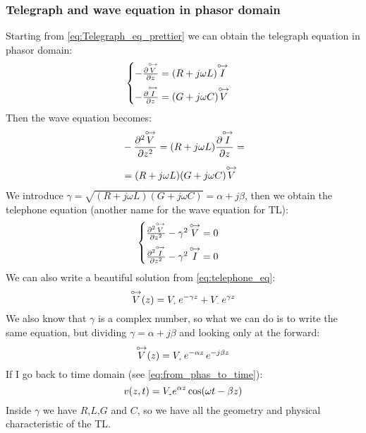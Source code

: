 \subsubsection*{Telegraph and wave equation in phasor domain}
Starting from \cref{eq:Telegraph_eq_prettier} we can obtain the telegraph equation in phasor domain:
\begin{equation}
  \begin{cases}\label{eq:telegraph_in_phas_1}
  -\frac{\partial \overset{\mathbin {{\circ \mkern-2.5mu\rightarrow}}}{V}}{\partial z}=(R+j\omega L)\overset{\mathbin {{\circ \mkern-2.5mu\rightarrow}}}{I}\\[5pt]
  -\frac{\partial \overset{\mathbin {{\circ \mkern-2.5mu\rightarrow}}}{I}}{\partial z}=(G+j\omega C)\overset{\mathbin {{\circ \mkern-2.5mu\rightarrow}}}{V}
  \end{cases}
\end{equation}
Then the wave equation becomes:
\begin{align}
  \begin{split}
    &-\frac{\partial^2 \overset{\mathbin {{\circ \mkern-2.5mu\rightarrow}}}{V}}{\partial z^2}=(R+j\omega L)\frac{\partial \overset{\mathbin {{\circ \mkern-2.5mu\rightarrow}}}{I}}{\partial z}=\\[5pt]
    &=(R+j\omega L)(G+j\omega C)\overset{\mathbin {{\circ \mkern-2.5mu\rightarrow}}}{V}
  \end{split}
\end{align}
We introduce $\gamma = \sqrt{(R+j\omega L)(G+j\omega C)}=\alpha+j\beta$, then we obtain the telephone equation (another name for the wave equation for TL):
\begin{equation}
  \begin{cases}
  \frac{\partial^2 \overset{\mathbin {{\circ \mkern-2.5mu\rightarrow}}}{V}}{\partial z^2}-\gamma^2\,\overset{\mathbin {{\circ \mkern-2.5mu\rightarrow}}}{V}=0\\[5pt]
  \frac{\partial^2 \overset{\mathbin {{\circ \mkern-2.5mu\rightarrow}}}{I}}{\partial z^2}-\gamma^2\,\overset{\mathbin {{\circ \mkern-2.5mu\rightarrow}}}{I}=0
  \end{cases}\label{eq:telephone_eq}
\end{equation}
We can also write a beautiful solution from \cref{eq:telephone_eq}:
\begin{equation}\label{eq:voltage_in_phas_domain}
  \phas{V}(z)=V\bottomPlus \,e^{-\gamma z}+V\bottomMinus \,e^{\gamma z}
\end{equation}
We also know that $\gamma$ is a complex number, so what we can do is to write the same equation, but dividing $\gamma = \alpha+j\beta$ and looking only at the forward:
\begin{equation}
  \phas{V}(z)=V\bottomPlus \,e^{-\alpha z}\,e^{-j\beta z}
\end{equation}
If I go back to time domain (see \cref{eq:from_phas_to_time}):
\begin{equation}\label{eq:from_phas_to_time_TL}
  v(z,t)=V\bottomPlus e^{\alpha z}\cos(\omega t-\beta z)
\end{equation}
Inside $\gamma $ we have $R$,$L$,$G$ and $C$, so we have all the geometry and physical characteristic of the TL.

